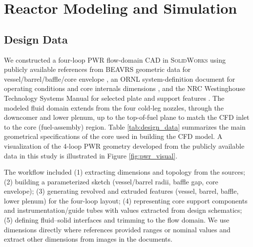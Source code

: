 \documentclass[review]{elsarticle}
\theoremstyle{definition}
\theoremstyle{definition}
\theoremstyle{remark}
\begin{document}
\section{Reactor Modeling and Simulation} 
\label{sec:models}

\subsection{Design Data}

We constructed a four-loop PWR flow-domain CAD in \textsc{SolidWorks} using publicly available references from BEAVRS geometric data for vessel/barrel/baffle/core envelope \cite{horelik2013benchmark}, an ORNL system-definition document for operating conditions and core internals dimensions \cite{ornl_sysdefdoc}, and the NRC Westinghouse Technology Systems Manual for selected plate and support features \cite{wec_sysmanual}. The modeled fluid domain extends from the four cold-leg nozzles, through the downcomer and lower plenum, up to the top-of-fuel plane to match the CFD inlet to the core (fuel-assembly) region. Table \ref{tab:design_data} summarizes the main geometrical specifications of the core used in building the CFD model. A visualization of the 4-loop PWR geometry developed from the publicly available data in this study is illustrated in Figure \ref{fig:pwr_visual}.

The workflow included (1) extracting dimensions and topology from the sources; (2) building a parameterized sketch (vessel/barrel radii, baffle gap, core envelope); (3) generating revolved and extruded features (vessel, barrel, baffle, lower plenum) for the four-loop layout; (4) representing core support components and instrumentation/guide tubes with values extracted from design schematics; (5) defining fluid–solid interfaces and trimming to the flow domain. We use dimensions directly where references provided ranges or nominal values and extract other dimensions from images in the documents.
\end{document}
